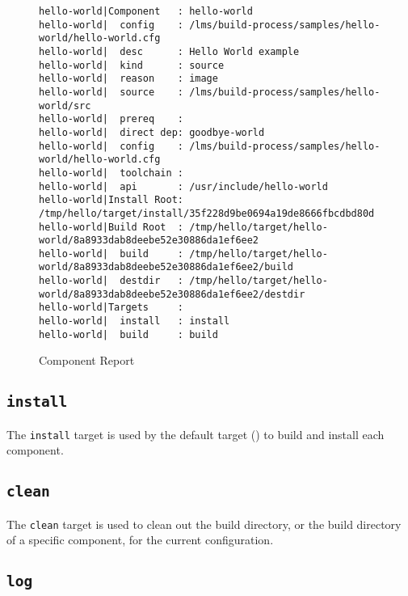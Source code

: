 \begin{landscape}
\begin{figure}
\hrulefill
\begin{small}
\begin{verbatim}
hello-world|Component   : hello-world
hello-world|  config    : /lms/build-process/samples/hello-world/hello-world.cfg
hello-world|  desc      : Hello World example
hello-world|  kind      : source
hello-world|  reason    : image
hello-world|  source    : /lms/build-process/samples/hello-world/src
hello-world|  prereq    :
hello-world|  direct dep: goodbye-world
hello-world|  config    : /lms/build-process/samples/hello-world/hello-world.cfg
hello-world|  toolchain :
hello-world|  api       : /usr/include/hello-world
hello-world|Install Root: /tmp/hello/target/install/35f228d9be0694a19de8666fbcdbd80d
hello-world|Build Root  : /tmp/hello/target/hello-world/8a8933dab8deebe52e30886da1ef6ee2
hello-world|  build     : /tmp/hello/target/hello-world/8a8933dab8deebe52e30886da1ef6ee2/build
hello-world|  destdir   : /tmp/hello/target/hello-world/8a8933dab8deebe52e30886da1ef6ee2/destdir
hello-world|Targets     :
hello-world|  install   : install
hello-world|  build     : build
\end{verbatim}
\end{small}
\hrulefill
\caption{Component Report}\label{usinglmsbw:component-report}
\end{figure}
\end{landscape}

\subsection{\texttt{install}}

The \texttt{install} target is used by the default target
() to build and install each component.

\subsection{\texttt{clean}}

The \texttt{clean} target is used to clean out the build directory, or
the build directory of a specific component, for the current
configuration.

\subsection{\texttt{log}}
\label{using:component-log-target}

